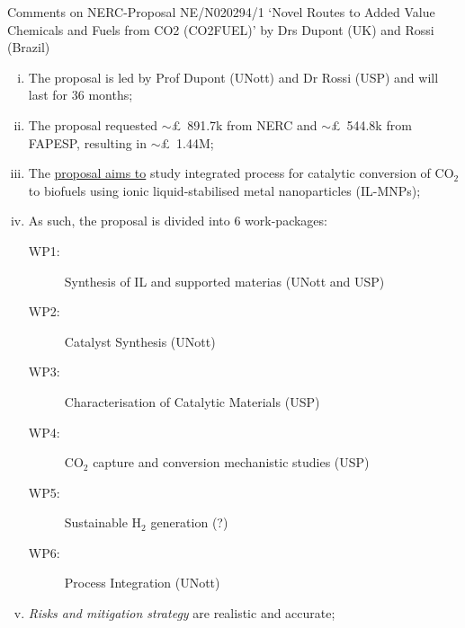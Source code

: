 \documentclass[14pt,twoside]{report}
\begin{document}
\medskip



\clearpage


\begin{center}
  {\Large Comments on NERC-Proposal NE/N020294/1 `Novel Routes to Added Value Chemicals and Fuels from CO2 (CO2FUEL)' by Drs Dupont (UK) and Rossi (Brazil)}
\end{center}

\begin{enumerate}[(i)]
%
   \item The proposal is led by Prof Dupont (UNott) and Dr Rossi (USP) and will last for 36 months;
%
   \item The proposal requested $\sim$\pounds~891.7k from NERC and $\sim$\pounds~544.8k from FAPESP, resulting in $\sim$\pounds~1.44M;
%
   \item The \underline{proposal aims to} study integrated process for catalytic conversion of CO$_{2}$ to biofuels using ionic liquid-stabilised metal nanoparticles (IL-MNPs);
% 
   \item As such, the proposal is divided into 6 work-packages:
      \begin{description}
           \item[WP1:] Synthesis of IL and supported materias (UNott and USP)
           \item[WP2:] Catalyst Synthesis (UNott) 
           \item[WP3:] Characterisation of Catalytic Materials (USP)
           \item[WP4:] CO$_{2}$ capture and conversion mechanistic studies (USP)
           \item[WP5:] Sustainable H$_{2}$ generation (?)
           \item[WP6:] Process Integration (UNott)
      \end{description}
%
   \item {\it Risks and mitigation strategy} are realistic and accurate;


\end{enumerate}
\end{document}
